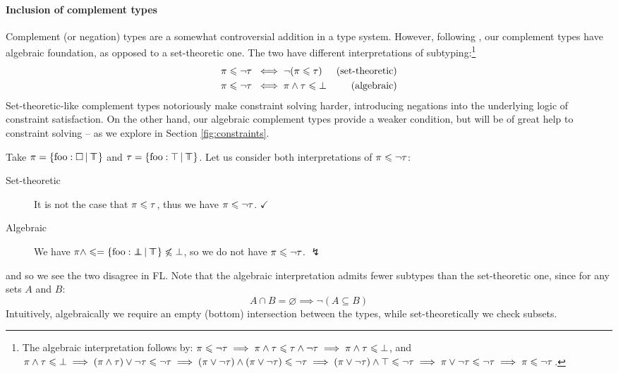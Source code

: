 \paragraph{Inclusion of complement types} Complement (or negation) types are a somewhat controversial addition in a type system. However, following \textcite{mlstruct}, our complement types have algebraic foundation, as opposed to a set-theoretic one. The two have different interpretations of subtyping:\footnote{The algebraic interpretation follows by: $\pi \leqslant \lnot \tau \implies \pi \land \tau \leqslant \tau \land \lnot \tau \implies \pi \land \tau \leqslant \bot$, and $\pi \land \tau \leqslant \bot \implies (\pi \land \tau) \lor \lnot \tau \leqslant \lnot \tau \implies (\pi \lor \lnot \tau) \land (\pi \lor \lnot \tau) \leqslant \lnot \tau \implies (\pi \lor \lnot \tau) \land \top \leqslant \lnot \tau \implies \pi \lor \lnot \tau \leqslant \lnot \tau \implies \pi \leqslant \lnot \tau$.}
\begin{align*}
    \pi \leqslant \lnot \tau \;&\iff \lnot (\pi \leqslant \tau) & \text{(set-theoretic)} \\
    \pi \leqslant \lnot \tau \;&\iff \pi \land \tau \leqslant \bot & \text{(algebraic)} 
\end{align*}
Set-theoretic-like complement types notoriously make constraint solving harder, introducing negations into the underlying logic of constraint satisfaction. On the other hand, our algebraic complement types provide a weaker condition, but will be of great help to constraint solving -- as we explore in Section \ref{fig:constraints}.

\begin{example}
    Take $\pi = \flext{\mathrm{foo}: \flabsent }{\flftop}$ and $\tau = \flext{\mathrm{foo}: \top}{\flftop}$. Let us consider both interpretations of $\pi \leqslant \lnot \tau$: \begin{description}
        \item[Set-theoretic] It is not the case that $\pi \leqslant \tau$, thus we have $\pi \leqslant \lnot \tau$. $\checkmark$
        \item[Algebraic] We have $\pi \meet \sub = \flext{\mathrm{foo} : \flfbot }{\flftop} \not\sub \bot$, so we do not have $\pi \leqslant \lnot \tau$. $\lightning$
    \end{description}
    and so we see the two disagree in FL.
    Note that the algebraic interpretation admits fewer subtypes than the set-theoretic one, since for any sets $A$ and $B$: 
    $$A \cap B = \varnothing \implies \lnot(A \subseteq B)$$ 
    Intuitively, algebraically we require an empty (bottom) intersection between the types, while set-theoretically we check subsets.
\end{example}

